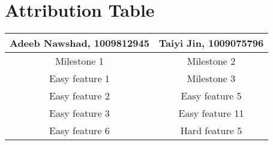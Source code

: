 \documentclass{article}
\begin{document}
\section{Attribution Table}

\begin{center}
\begin{tabular}{|| c | c ||}
\hline
 Adeeb Nawshad, 1009812945 &  Taiyi Jin, 1009075796 \\ 
 \hline
 Milestone 1 & Milestone 2\\
 \hline
 Easy feature 1 & Milestone 3\\
 \hline
 Easy feature 2 & Easy feature 5\\ 
 \hline
 Easy feature 3 & Easy feature 11\\ 
 \hline
 Easy feature 6 & Hard feature 5\\ 
 \hline
\end{tabular}
\end{center}

\end{document}

